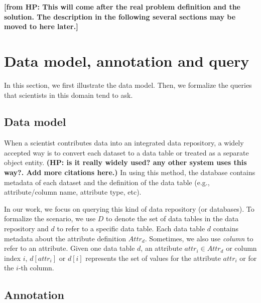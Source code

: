 \documentclass[conference]{IEEEtran}
\newcommand{\from}[2]{{\bf[{\sc from #1:} #2]}}
\begin{document}
\from{HP}{This will come after the real problem definition and the
  solution. The description in the following several sections may be
  moved to here later.}

\section{Data model, annotation and query}\label{sec:dataquery}




In this section, we first illustrate the data model. Then, we
formalize the queries that scientists in this domain tend to ask. 

\subsection{Data model}\label{sec:datamodel}

When a scientist contributes data into an integrated data repository,
a widely accepted way is to convert each dataset to a data
table\cite{tdar} or treated as a separate object entity\cite{knb}. 
{\bf (HP: is it really widely used? any other system uses this
  way?. Add more citations here.)}
In using this method, the database contains metadata of each
dataset and the definition of the data table (e.g., attribute/column
name, attribute type, etc). 


In our work, we focus on querying this kind of data repository (or
databases). To formalize the scenario, we use $D$ to denote the set of data
tables in the data repository and $d$ to refer to a specific data
table. Each data table $d$ contains metadata about the attribute
definition $Attr_{d}$. Sometimes, we also use {\em column} to refer to an
attribute. 
Given one data table $d$, an attribute $attr_i \in Attr_{d}$ or column index $i$, 
$d[attr_i]$ or $d[i]$ represents the set of values for the attribute
$attr_i$ or for the $i$-th column.

\subsection{Annotation}\label{sec:annotation}
\end{document}
